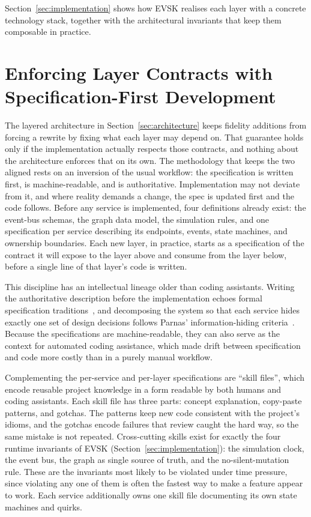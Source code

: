 \documentclass[runningheads]{llncs}
\begin{document}
Section~\ref{sec:implementation} shows how EVSK realises each layer with a concrete technology stack, together with the architectural invariants that keep them composable in practice.

\section{Enforcing Layer Contracts with Specification-First Development}\label{sec:methodology}

The layered architecture in Section~\ref{sec:architecture} keeps fidelity additions from forcing a rewrite by fixing what each layer may depend on. That guarantee holds only if the implementation actually respects those contracts, and nothing about the architecture enforces that on its own. The methodology that keeps the two aligned rests on an inversion of the usual workflow: the specification is written first, is machine-readable, and is authoritative. Implementation may not deviate from it, and where reality demands a change, the spec is updated first and the code follows. Before any service is implemented, four definitions already exist: the event-bus schemas, the graph data model, the simulation rules, and one specification per service describing its endpoints, events, state machines, and ownership boundaries. Each new layer, in practice, starts as a specification of the contract it will expose to the layer above and consume from the layer below, before a single line of that layer's code is written.

This discipline has an intellectual lineage older than coding assistants. Writing the authoritative description before the implementation echoes formal specification traditions~\cite{lamport2002}, and decomposing the system so that each service hides exactly one set of design decisions follows Parnas' information-hiding criteria~\cite{parnas1972}. Because the specifications are machine-readable, they can also serve as the context for automated coding assistance, which made drift between specification and code more costly than in a purely manual workflow.

Complementing the per-service and per-layer specifications are ``skill files'', which encode reusable project knowledge in a form readable by both humans and coding assistants. Each skill file has three parts: concept explanation, copy-paste patterns, and gotchas. The patterns keep new code consistent with the project's idioms, and the gotchas encode failures that review caught the hard way, so the same mistake is not repeated. Cross-cutting skills exist for exactly the four runtime invariants of EVSK (Section~\ref{sec:implementation}): the simulation clock, the event bus, the graph as single source of truth, and the no-silent-mutation rule. These are the invariants most likely to be violated under time pressure, since violating any one of them is often the fastest way to make a feature appear to work. Each service additionally owns one skill file documenting its own state machines and quirks.
\end{document}
